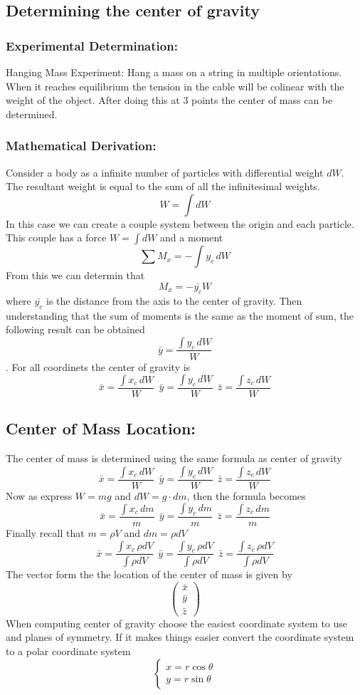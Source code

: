 \documentclass[14pt]{article}
\begin{document}
    \subsection{Determining the center of gravity}
    \subsubsection{Experimental Determination:}
    Hanging Mass Experiment: Hang a mass on a string in multiple
    orientations. When it reaches equilibrium the tension in the cable
    will be colinear with the weight of the object. After doing this at
    3 points the center of mass can be determined.
    \subsubsection{Mathematical Derivation:}
    Consider a body as a infinite number of particles with differential
    weight $dW$. The resultant weight is equal to the sum of all the
    infinitesimal weights. $$W=\int dW$$ In this case we can create a
    couple system between the origin and each particle. This couple has
    a force $W=\int dW$ and a moment $$\sum M_x=-\int y_c\, dW$$ From
    this we can determin that $$M_x=-\bar {y_c}W$$ where $\bar{y_c}$ is
    the distance from the axis to the center of gravity. Then
    understanding that the sum of moments is the same as the moment of
    sum, the following result can be obtained $$\bar y=\frac{\int y_c\,
    dW}{W}$$. For all coordinets the center of gravity is $$\bar
    x=\frac{\int x_c\, dW}{W}\ \  \bar y=\frac{\int y_c\, dW}{W}\ \ \bar
    z=\frac{\int z_c\, dW}{W}$$
    \subsection{Center of Mass Location:}
    The center of mass is determined using the same formula as center of
    gravity
    $$\bar x=\frac{\int x_c\, dW}{W}\ \  \bar y=\frac{\int y_c\, dW}{W}\
    \ \bar z=\frac{\int z_c\, dW}{W}$$ Now as express $W=mg$ and
    $dW=g\cdot dm$, then the formula becomes
    $$\bar x=\frac{\int x_c\, dm}{m}\ \  \bar y=\frac{\int y_c\, dm}{m}\
    \ \bar z=\frac{\int z_c\, dm}{m}$$ Finally recall that $m=\rho V$
    and $dm=\rho dV$
    $$\bar x=\frac{\int x_c\, \rho dV}{\int \rho dV}\ \  \bar
    y=\frac{\int y_c\, \rho dV}{\int \rho dV}\ \ \bar z=\frac{\int z_c\,
    \rho dV}{\int \rho dV}$$ The vector form the the location of the
    center of mass is given by $$\begin{pmatrix} \bar x\\ \bar y\\ \bar
    z \end{pmatrix}$$ When computing center of gravity choose the
    easiest coordinate system to use and planes of symmetry. If it makes
    things easier convert the coordinate system to a polar coordinate
    system 
    $$\left\{\begin{array}{lr} x=r\cos\theta\\
        y=r\sin\theta \end{array}\right.
    $$
\end{document}
